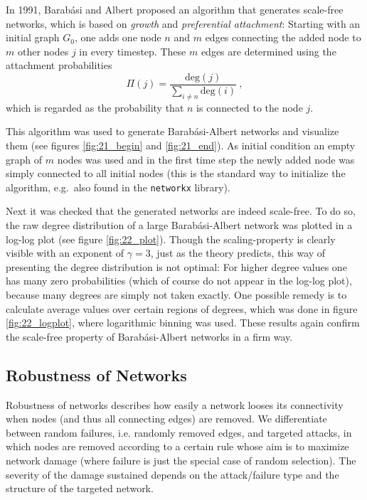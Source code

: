 \documentclass{scrartcl}
\begin{document}
In 1991, Barab\'asi and Albert proposed an algorithm that generates
scale-free networks, which is based on \emph{growth} and \emph{preferential
attachment}: Starting with an initial graph $G_0$, one adds one node $n$ and
$m$ edges connecting the added node to $m$ other nodes $j$ in every timestep.
These $m$ edges are determined using the attachment probabilities
\begin{equation}
    \Pi(j) = \frac{\mathrm{deg}(j)}{\sum_{i\neq n} \mathrm{deg}(i)}~,
\end{equation}
which is regarded as the probability that $n$ is connected to the node $j$.

 This algorithm was used to generate Barab\'asi-Albert
networks and visualize them (see figures \ref{fig:21_begin} and \ref{fig:21_end}).
As initial condition an empty graph of $m$ nodes was used and in the first
time step the newly added node was simply connected to all initial nodes
(this is the standard way to initialize the algorithm, e.g.\ also found in
the \texttt{networkx} library).

 Next it was checked that the generated networks are indeed scale-free.
To do so, the raw degree distribution of a large Barab\'asi-Albert network
was plotted in a log-log plot (see figure \ref{fig:22_plot}). Though the
scaling-property is clearly visible with an exponent of $\gamma = 3$, just
as the theory predicts, this way of presenting the degree distribution is
not optimal: For higher degree values one has many zero probabilities
(which of course do not appear in the log-log plot), because many degrees are
simply not taken exactly. One possible remedy is to calculate average
values over certain regions of degrees, which was done in figure
\ref{fig:22_logplot}, where logarithmic binning was used. These results
again confirm the scale-free property of Barab\'asi-Albert networks in a firm way.

\subsection{Robustness of Networks}
Robustness of networks describes how easily a network looses its connectivity when nodes (and thus all connecting edges) are removed. We differentiate between random failures, i.e. randomly removed edges, and targeted attacks, in which nodes are removed according to a certain rule whose aim is to maximize network damage (where failure is just the special case of random selection). The severity of the damage sustained depends on the attack/failure type and the structure of the targeted network. 
\end{document}

